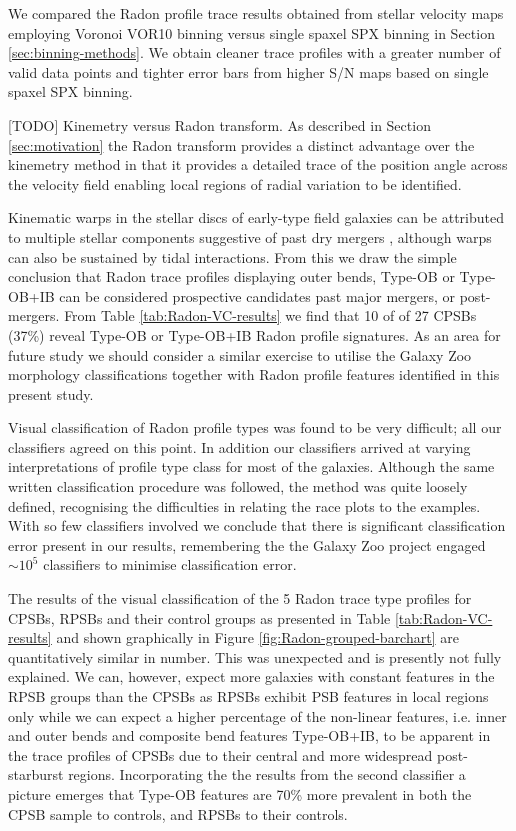 We compared the Radon profile trace results obtained from stellar velocity maps employing Voronoi VOR10 binning versus single spaxel SPX binning in Section \ref{sec:binning-methods}. We obtain cleaner trace profiles with a greater number of valid data points and tighter error bars from higher S/N maps based on single spaxel SPX binning.

[TODO] Kinemetry versus Radon transform. As described in Section \ref{sec:motivation} the Radon transform provides a distinct advantage over the kinemetry method in that it provides a detailed trace of the position angle across the velocity field enabling local regions of radial variation to be identified. 

Kinematic warps in the stellar discs of early-type field galaxies can be attributed to multiple stellar components suggestive of past dry mergers \citep{2005AJ....130.2647V}, although warps can also be sustained by tidal interactions.
From this we draw the simple conclusion that Radon trace profiles displaying outer bends, Type-OB or Type-OB+IB can be considered prospective candidates past major mergers, or post-mergers. From Table \ref{tab:Radon-VC-results} we find that 10 of of 27 CPSBs (37\%) reveal Type-OB or Type-OB+IB Radon profile signatures. 
As an area for future study we should consider a similar exercise to utilise the Galaxy Zoo morphology classifications together with Radon profile features identified in this present study. 

Visual classification of Radon profile types was found to be very difficult; all our classifiers agreed on this point. In addition our classifiers arrived at varying interpretations of profile type class for most of the galaxies. Although the same written classification procedure was followed, the method was quite loosely defined, recognising the difficulties in relating the race plots to the examples. With so few classifiers involved we conclude that there is significant classification error present in our results, remembering the the Galaxy Zoo project engaged $\sim10^5$ classifiers to minimise classification error.

The results of the visual classification of the 5 Radon trace type profiles for CPSBs, RPSBs and their control groups as presented in Table \ref{tab:Radon-VC-results} and shown graphically in Figure \ref{fig:Radon-grouped-barchart} are quantitatively similar in number. This was unexpected and is presently not fully explained. We can, however, expect more galaxies with constant features in the RPSB groups than the CPSBs as RPSBs exhibit PSB features in local regions only while we can expect a higher percentage of the non-linear features, i.e. inner and outer bends and composite bend features Type-OB+IB, to be apparent in the trace profiles of CPSBs due to their central and more widespread post-starburst regions. Incorporating the the results from the second classifier a picture emerges that Type-OB features are 70\% more prevalent in both the CPSB sample to controls, and RPSBs to their controls. 

